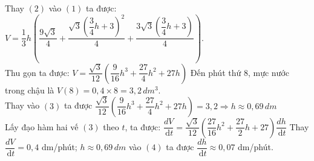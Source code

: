 \begin{ex}
{\begin{itemchoice}
{        }
        Thay $(2)$ vào $(1)$ ta được: $V=\dfrac{1}{3}h\left(\dfrac{9\sqrt{3}}{4}+\dfrac{\sqrt{3}\left(\dfrac{3}{4}h+3\right)^2}{4}+\dfrac{3\sqrt{3}\left(\dfrac{3}{4}h+3\right)}{4}\right)$.\\
        Thu gọn ta được: $V=\dfrac{\sqrt{3}}{12}\left(\dfrac{9}{16}h^3+\dfrac{27}{4}h^2+27h\right)$ 
        \itemch Đến phút thứ $8$, mực nước trong chậu là $V(8)=0{,}4\times 8=3{,}2\,dm^3$.\\
        Thay vào $(3)$ ta được $\dfrac{\sqrt{3}}{12}\left(\dfrac{9}{16}h^3+\dfrac{27}{4}h^2+27h\right)=3{,}2\Rightarrow h\approx 0{,}69\,dm$\\
        Lấy đạo hàm hai vế $(3)$ theo $t$, ta được: $\dfrac{dV}{\mathrm{\,d}t}=\dfrac{\sqrt{3}}{12}\left(\dfrac{27}{16}h^2+\dfrac{27}{2}h+27\right)\dfrac{dh}{\mathrm{\,d}t}$ 
        Thay $\dfrac{dV}{\mathrm{\,d}t}=0{,}4$ dm/phút; $h\approx 0{,}69\,dm$ vào $(4)$ ta được $\dfrac{dh}{\mathrm{\,d}t}\approx 0{,}07$ dm/phút.
    \end{itemchoice}
    
    }
\end{ex}


